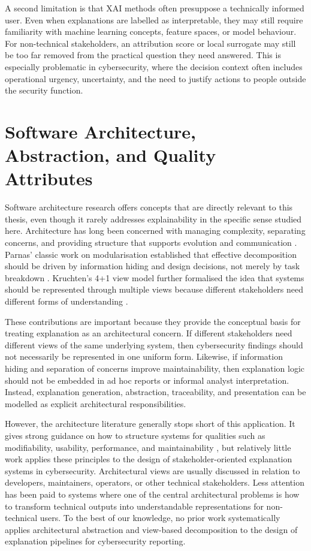 A second limitation is that XAI methods often presuppose a technically informed user. Even when explanations are labelled as interpretable, they may still require familiarity with machine learning concepts, feature spaces, or model behaviour. For non-technical stakeholders, an attribution score or local surrogate may still be too far removed from the practical question they need answered. This is especially problematic in cybersecurity, where the decision context often includes operational urgency, uncertainty, and the need to justify actions to people outside the security function.

\section{Software Architecture, Abstraction, and Quality Attributes}

Software architecture research offers concepts that are directly relevant to this thesis, even though it rarely addresses explainability in the specific sense studied here. Architecture has long been concerned with managing complexity, separating concerns, and providing structure that supports evolution and communication \cite{bass2012software}. Parnas' classic work on modularisation established that effective decomposition should be driven by information hiding and design decisions, not merely by task breakdown \cite{parnas1972modules}. Kruchten’s 4+1 view model further formalised the idea that systems should be represented through multiple views because different stakeholders need different forms of understanding \cite{kruchten1995viewmodel}.

These contributions are important because they provide the conceptual basis for treating explanation as an architectural concern. If different stakeholders need different views of the same underlying system, then cybersecurity findings should not necessarily be represented in one uniform form. Likewise, if information hiding and separation of concerns improve maintainability, then explanation logic should not be embedded in ad hoc reports or informal analyst interpretation. Instead, explanation generation, abstraction, traceability, and presentation can be modelled as explicit architectural responsibilities.

However, the architecture literature generally stops short of this application. It gives strong guidance on how to structure systems for qualities such as modifiability, usability, performance, and maintainability \cite{bass2012software}, but relatively little work applies these principles to the design of stakeholder-oriented explanation systems in cybersecurity. Architectural views are usually discussed in relation to developers, maintainers, operators, or other technical stakeholders. Less attention has been paid to systems where one of the central architectural problems is how to transform technical outputs into understandable representations for non-technical users. To the best of our knowledge, no prior work systematically applies architectural abstraction and view-based decomposition to the design of explanation pipelines for cybersecurity reporting.

